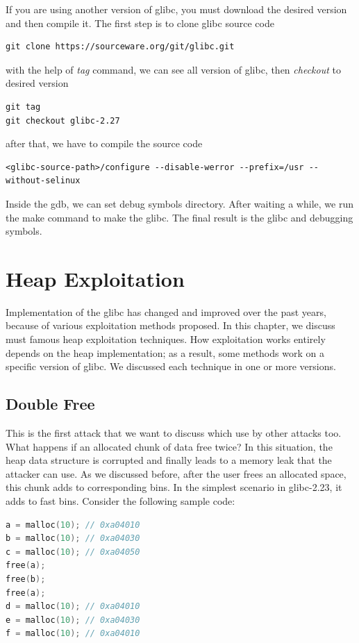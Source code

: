 \documentclass{masterthesis}
\newcommand*\libc{glibc}
\newcommand*\fb{fast bins}
\begin{document}
If you are using another version of \libc{}, you must download the desired version and then compile it. The first step is to clone \libc{} source code
\begin{lstlisting}[frame=tlrb]
git clone https://sourceware.org/git/glibc.git
\end{lstlisting}
with the help of \emph{tag} command, we can see all version of \libc{}, then \emph{checkout} to desired version
\begin{lstlisting}[frame=tlrb]
git tag
git checkout glibc-2.27
\end{lstlisting}
after that, we have to compile the source code
\begin{lstlisting}[frame=tlrb]
<glibc-source-path>/configure --disable-werror --prefix=/usr --without-selinux
\end{lstlisting}
Inside the gdb, we can set debug symbols directory. After waiting a while, we run the make command to make the \libc{}. The final result is the \libc{} and debugging symbols.

\chapter{Heap Exploitation }

Implementation of the \libc{} has changed and improved over the past years, because of various exploitation methods proposed. In this chapter, we discuss must famous heap exploitation techniques. How exploitation works entirely depends on the heap implementation; as a result, some methods work on a specific version of \libc{}. We discussed each technique in one or more versions.

\section{Double Free}
This is the first attack that we want to discuss which use by other attacks too. What happens if an allocated chunk of data free twice? In this situation, the heap data structure is corrupted and finally leads to a memory leak that the attacker can use. As we discussed before, after the user frees an allocated space, this chunk adds to corresponding bins. In the simplest scenario in \libc{-2.23}, it adds to \fb{}. Consider the following sample code:

\begin{lstlisting}[language=c,frame=tlrb]
a = malloc(10); // 0xa04010
b = malloc(10); // 0xa04030
c = malloc(10); // 0xa04050
free(a);
free(b);
free(a);
d = malloc(10); // 0xa04010
e = malloc(10); // 0xa04030
f = malloc(10); // 0xa04010
\end{lstlisting}
\end{document}
